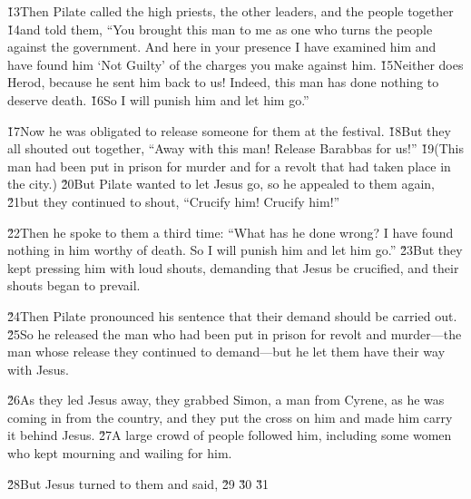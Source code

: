 \v{13}Then Pilate called the high priests, the other leaders, and the people together \v{14}and told them, ``You brought this man to me as one who turns the people against the government. And here in your presence I have examined him and have found him `Not Guilty' of the charges you make against him. \v{15}Neither does Herod, because he sent him back to us! Indeed, this man has done nothing to deserve death. \v{16}So I will punish him and let him go.''

\v{17}Now he was obligated to release someone for them at the festival. \v{18}But they all shouted out together, ``Away with this man! Release Barabbas for us!'' \v{19}(This man had been put in prison for murder and for a revolt that had taken place in the city.) \v{20}But Pilate wanted to let Jesus go, so he appealed to them again, \v{21}but they continued to shout, ``Crucify him! Crucify him!''

\v{22}Then he spoke to them a third time: ``What has he done wrong? I have found nothing in him worthy of death. So I will punish him and let him go.'' \v{23}But they kept pressing him with loud shouts, demanding that Jesus be crucified, and their shouts began to prevail.

\v{24}Then Pilate pronounced his sentence that their demand should be carried out. \v{25}So he released the man who had been put in prison for revolt and murder---the man whose release they continued to demand---but he let them have their way with Jesus.

\v{26}As they led Jesus away, they grabbed Simon, a man from Cyrene, as he was coming in from the country, and they put the cross on him and made him carry it behind Jesus. \v{27}A large crowd of people followed him, including some women who kept mourning and wailing for him.

\v{28}But Jesus turned to them and said,  \v{29} \v{30} \v{31}

